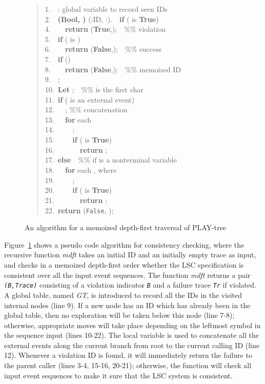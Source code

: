 \documentclass[]{llncs}
\begin{document}
\begin{figure}[htp]
\begin{quote}
{
\small\tt

1.~~: global variable to record seen IDs\\
2.~~{\bf (Bool, )} (:ID, :).~~{\bf if} ( is {\bf True}) \\
4.~~\verb+  +{\bf return} ({\bf True},);~~\%\% violation\\
5.~~{\bf if} ( is )\\
6.~~\verb+  +{\bf return} ({\bf False},);~~\%\% success\\
7.~~{\bf if} ()\\
8.~~\verb+  +{\bf return} ({\bf False},);~~\%\% memoized ID\\
9.~~;\\
10.~{\bf Let} ;~~\%\%  is the first char\\
11.~{\bf if} ( is an external event) \\
12.~\verb+  +; \%\% concatenation\\
13.~\verb+  +{\bf for} each \\
14.~\verb+    +;\\
15.~\verb+    +{\bf if} ( is {\bf True})\\
16.~\verb+      +{\bf return} ;\\
17.~{\bf else}~~\%\% if  is a nonterminal variable\\
18.~\verb+  +{\bf for} each , where \\
19.~\verb+    +;\\
20.~\verb+    +{\bf if} ( is {\bf True})\\
21.~\verb+      +{\bf return} ;\\
22.~{\bf return} ({\tt False}, );
}
\end{quote}
\caption{An algorithm for a memoized depth-first traversal of PLAY-tree}
\label{fig:mdft}
\end{figure}

Figure~\ref{fig:mdft} shows a pseudo code algorithm for consistency checking,
where the recursive function {\em mdft}
takes an initial ID and an initially empty trace as input,
and checks in a memoized depth-first order whether the LSC
specification is consistent over all
the input event sequences.
The function {\em mdft} returns a pair {\tt\em (B,Trace)}
consisting of a violation indicator {\tt\em B} and a failure
trace {\tt\em Tr} if violated.
A global table, named {\em GT}, is
introduced to record all the IDs in the visited internal nodes
(line 9). If a new node has an ID which has already
been in the global table, then no exploration will be taken below
this node (line 7-8); otherwise, appropriate moves will take place
depending on the leftmost symbol in the sequence input  (lines 10-22).
The local variable  is used to concatenate all the external
events along the current branch from root to
the current calling ID (line 12).
Whenever a violation ID is found, it will immediately return the failure
 to the parent caller (lines 3-4, 15-16, 20-21);
otherwise, the function  will check all input event sequences
to make it sure that the LSC system is consistent.
\end{document}
